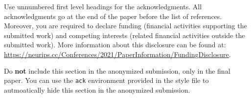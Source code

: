 \documentclass{article}
\begin{document}





\begin{ack}
Use unnumbered first level headings for the acknowledgments. All acknowledgments
go at the end of the paper before the list of references. Moreover, you are required to declare
funding (financial activities supporting the submitted work) and competing interests (related financial activities outside the submitted work).
More information about this disclosure can be found at: \url{https://neurips.cc/Conferences/2021/PaperInformation/FundingDisclosure}.

Do {\bf not} include this section in the anonymized submission, only in the final paper. You can use the \texttt{ack} environment provided in the style file to autmoatically hide this section in the anonymized submission.
\end{ack}

\small{



}
\end{document}
